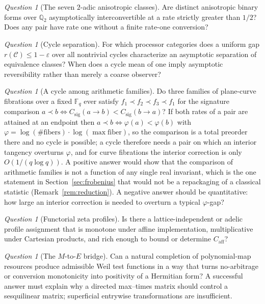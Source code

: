 \documentclass[11pt]{article}
\theoremstyle{definition}
\theoremstyle{plain}
\theoremstyle{remark}
\newtheorem{question}[definition]{Question}
\newcommand{\F}{\mathbb F}
\newcommand{\Q}{\mathbb Q}
\newcommand{\caff}{C_{\mathrm{aff}}}
\newcommand{\csig}{C_{\mathrm{sig}}}
\begin{document}
\begin{question}[The seven \(2\)-adic anisotropic classes]
Are distinct anisotropic binary forms over \(\Q_2\) asymptotically
interconvertible at a rate strictly greater than \(1/2\)?  Does any pair have
rate one without a finite rate-one conversion?
\end{question}

\begin{question}[Cycle separation]
For which processor categories does a uniform gap
\(r(\mathcal C)\le1-\varepsilon\) over all nontrivial cycles characterize an
asymptotic separation of equivalence classes?  When does a cycle mean of one
imply asymptotic reversibility rather than merely a coarse observer?
\end{question}

\begin{question}[A cycle among arithmetic families]
\label{q:arith-cycle}
Do three families of plane-curve fibrations over a fixed \(\F_q\) ever satisfy
\(f_1\prec f_2\prec f_3\prec f_1\) for the signature comparison
\(a\prec b\iff\csig(a\to b)<\csig(b\to a)\)?  If both rates of a pair are
attained at an endpoint then \(a\prec b\iff\varphi(a)<\varphi(b)\) with
\(\varphi=\log(\#\text{fibers})\cdot\log(\max\text{fiber})\), so the comparison
is a total preorder there and no cycle is possible; a cycle therefore needs a
pair on which an interior tangency overturns \(\varphi\), and for curve
fibrations the interior correction is only \(O(1/(q\log q))\).  A positive
answer would show that the comparison of arithmetic families is not a function
of any single real invariant, which is the one statement in
Section~\ref{sec:frobenius} that would not be a repackaging of a classical
statistic (Remark~\ref{rem:reduction}).  A negative answer should be
quantitative: how large an interior correction is needed to overturn a typical
\(\varphi\)-gap?
\end{question}

\begin{question}[Functorial zeta profiles]
Is there a lattice-independent or adelic profile assignment that is monotone
under affine implementation, multiplicative under Cartesian products, and
rich enough to bound or determine \(\caff\)?
\end{question}

\begin{question}[The \(M\)-to-\(E\) bridge]
Can a natural completion of polynomial-map resources produce admissible Weil
test functions in a way that turns no-arbitrage or conversion monotonicity
into positivity of a Hermitian form?  A successful answer must explain why a
directed max--times matrix should control a sesquilinear matrix; superficial
entrywise transformations are insufficient.
\end{question}
\end{document}
